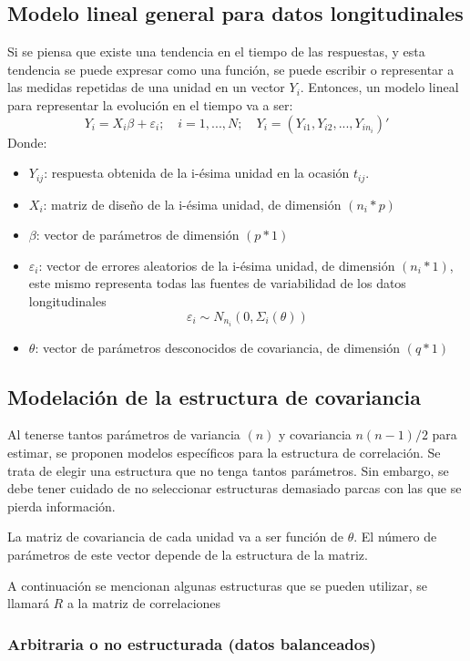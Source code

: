 \documentclass[spanish]{article}
\numberwithin{figure}{subsection}
\numberwithin{equation}{subsection}
\numberwithin{table}{subsection}
\begin{document}
\subsection{Modelo lineal general para datos longitudinales}

Si se piensa que existe una tendencia en el tiempo de las respuestas, y esta tendencia se puede expresar como una función,
se puede escribir o representar a las medidas repetidas de una unidad en un vector $Y_i$. Entonces, un modelo lineal para
representar la evolución en el tiempo va a ser:
\[ Y_i = X_i\beta + \varepsilon_i; \quad i = 1, ..., N; \quad Y_i = (Y_{i1}, Y_{i2}, ..., Y_{in_{i}})' \]
Donde:

\begin{itemize}
	\item $Y_{ij}$: respuesta obtenida de la i-ésima unidad en la ocasión $t_{ij}$.
	\item $X_i$: matriz de diseño de la i-ésima unidad, de dimensión $(n_i*p)$
	\item $\beta $: vector de parámetros de dimensión $(p*1)$
	\item $\varepsilon_i$: vector de errores aleatorios de la i-ésima unidad, de dimensión $(n_i*1)$, este mismo representa todas
	las fuentes de variabilidad de los datos longitudinales
	\[ \varepsilon_i \sim N_{n_i}(0, \varSigma_i(\theta )) \]
	\item $\theta$: vector de parámetros desconocidos de covariancia, de dimensión $(q*1)$
\end{itemize}

\subsection{Modelación de la estructura de covariancia}

Al tenerse tantos parámetros de variancia $(n)$ y covariancia $n(n-1)/2$ para estimar, se proponen modelos específicos
para la estructura de correlación. Se trata de elegir una estructura que no tenga tantos parámetros. Sin embargo, se debe
tener cuidado de no seleccionar estructuras demasiado parcas con las que se pierda información.

La matriz de covariancia de cada unidad va a ser función de $\theta$. El número de parámetros de este vector depende de la
estructura de la matriz.

A continuación se mencionan algunas estructuras que se pueden utilizar, se llamará $R$ a la matriz de correlaciones

\subsubsection{Arbitraria o no estructurada (datos balanceados)}
\end{document}
